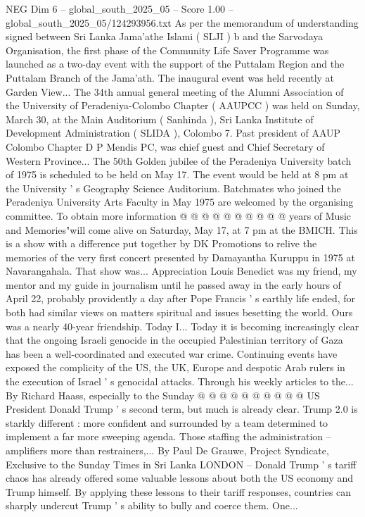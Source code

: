 \begin{textsample}{NEG Dim 6 – global\_south\_2025\_05 – Score 1.00 – global\_south\_2025\_05/124293956.txt}  \label{ex:f6_neg_425}
As per the memorandum of understanding signed between Sri Lanka Jama'athe Islami ( SLJI ) b and the Sarvodaya Organisation, the first phase of the Community Life Saver Programme was launched as a two-day event with the support of the Puttalam Region and the Puttalam Branch of the Jama'ath.
The inaugural event was held recently at Garden View...
The 34th annual general meeting of the Alumni Association of the University of Peradeniya-Colombo Chapter ( AAUPCC ) was held on Sunday, March 30, at the Main Auditorium ( Sanhinda ), Sri Lanka Institute of Development Administration ( SLIDA ), Colombo 7.
Past president of AAUP Colombo Chapter D P Mendis PC, was chief guest and Chief Secretary of Western Province...
The 50th Golden jubilee of the Peradeniya University batch of 1975 is scheduled to be held on May 17.
The event would be held at 8 pm at the University ' s Geography Science Auditorium.
Batchmates who joined the Peradeniya University Arts Faculty in May 1975 are welcomed by the organising committee.
To obtain more information @ @ @ @ @ @ @ @ @ @ years of Music and Memories"will come alive on Saturday, May 17, at 7 pm at the BMICH.
This is a show with a difference put together by DK Promotions to relive the memories of the very first concert presented by Damayantha Kuruppu in 1975 at Navarangahala.
That show was...
Appreciation Louis Benedict was my friend, my mentor and my guide in journalism until he passed away in the early hours of April 22, probably providently a day after Pope Francis ' s earthly life ended, for both had similar views on matters spiritual and issues besetting the world.
Ours was a nearly 40-year friendship.
Today I...
Today it is becoming increasingly clear that the ongoing Israeli genocide in the occupied Palestinian territory of Gaza has been a well-coordinated and executed war crime.
Continuing events have exposed the complicity of the US, the UK, Europe and despotic Arab rulers in the execution of Israel ' s genocidal attacks.
Through his weekly articles to the...
By Richard Haass, especially to the Sunday @ @ @ @ @ @ @ @ @ @ US President Donald Trump ' s second term, but much is already clear.
Trump 2.0 is starkly different : more confident and surrounded by a team determined to implement a far more sweeping agenda.
Those staffing the administration -- amplifiers more than restrainers,...
By Paul De Grauwe, Project Syndicate, Exclusive to the Sunday Times in Sri Lanka LONDON -- Donald Trump ' s tariff chaos has already offered some valuable lessons about both the US economy and Trump himself.
By applying these lessons to their tariff responses, countries can sharply undercut Trump ' s ability to bully and coerce them.
One...

\end{textsample}
